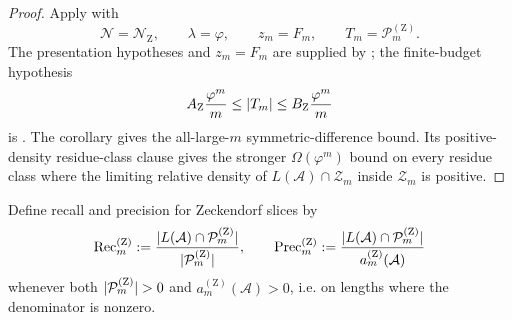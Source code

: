 \begin{proof}
  Apply  with
  \[
    \mathcal N=\mathcal N_{\mathrm Z},\qquad
    \lambda=\varphi,\qquad
    z_m=F_m,\qquad
    T_m=\mathcal P_m^{(\mathrm Z)}.
  \]
  The presentation hypotheses and \(z_m=F_m\) are supplied by
  ; the finite-budget
  hypothesis
  \[
    A_{\mathrm Z}\frac{\varphi^m}{m}
    \le \lvert T_m \rvert
    \le B_{\mathrm Z}\frac{\varphi^m}{m}
  \]
  is . The corollary gives the all-large-\(m\)
  symmetric-difference bound. Its positive-density residue-class clause
  gives the stronger \(\Omega(\varphi^m)\) bound on every residue class
  where the limiting relative density of
  \(L(\mathcal A)\cap\mathcal Z_m\) inside \(\mathcal Z_m\) is positive.
\end{proof}

Define recall and precision for Zeckendorf slices by
\[
  \mathrm{Rec}_m^{(\mathrm Z)}
  :=\frac{\lvert L(\mathcal A)\cap\mathcal P_m^{(\mathrm Z)} \rvert}
          {\lvert \mathcal P_m^{(\mathrm Z)} \rvert},
  \qquad
  \mathrm{Prec}_m^{(\mathrm Z)}
  :=\frac{\lvert L(\mathcal A)\cap\mathcal P_m^{(\mathrm Z)} \rvert}
          {a_m^{(\mathrm Z)}(\mathcal A)}
\]
whenever both \(\lvert \mathcal P_m^{(\mathrm Z)} \rvert>0\) and
\(a_m^{(\mathrm Z)}(\mathcal A)>0\), i.e. on lengths where the
denominator is nonzero.

